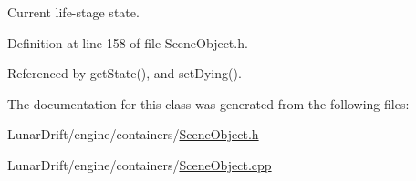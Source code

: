 Current life-\/stage state. 



Definition at line 158 of file Scene\+Object.\+h.



Referenced by get\+State(), and set\+Dying().



The documentation for this class was generated from the following files\+:\begin{DoxyCompactItemize}
\item 
Lunar\+Drift/engine/containers/\hyperlink{_scene_object_8h}{Scene\+Object.\+h}\item 
Lunar\+Drift/engine/containers/\hyperlink{_scene_object_8cpp}{Scene\+Object.\+cpp}\end{DoxyCompactItemize}
